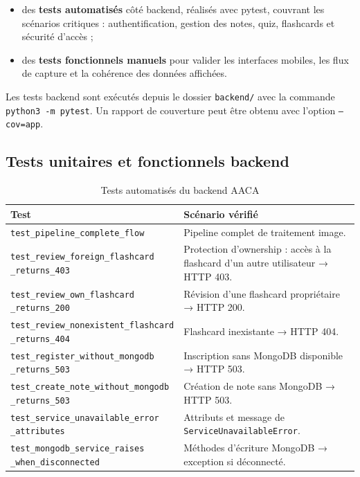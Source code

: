 \documentclass[12pt,a4paper]{report}
\begin{document}
\begin{itemize}[label=--]
    \item des \textbf{tests automatisés} côté backend, réalisés avec pytest, couvrant les scénarios critiques : authentification, gestion des notes, quiz, flashcards et sécurité d'accès ;
    \item des \textbf{tests fonctionnels manuels} pour valider les interfaces mobiles, les flux de capture et la cohérence des données affichées.
\end{itemize}

Les tests backend sont exécutés depuis le dossier \texttt{backend/} avec la commande \texttt{python3 -m pytest}. Un rapport de couverture peut être obtenu avec l'option \texttt{--cov=app}.

\subsection{Tests unitaires et fonctionnels backend}

\begin{table}[H]
\centering
\begin{tabularx}{\textwidth}{|p{6.5cm}|X|}
\hline
\textbf{Test} & \textbf{Scénario vérifié}\\
\hline
\texttt{test\_pipeline\_complete\_flow} & Pipeline complet de traitement image.\\
\hline
\texttt{test\_review\_foreign\_flashcard\\\_returns\_403} & Protection d'ownership : accès à la flashcard d'un autre utilisateur → HTTP 403.\\
\hline
\texttt{test\_review\_own\_flashcard\\\_returns\_200} & Révision d'une flashcard propriétaire → HTTP 200.\\
\hline
\texttt{test\_review\_nonexistent\_flashcard\\\_returns\_404} & Flashcard inexistante → HTTP 404.\\
\hline
\texttt{test\_register\_without\_mongodb\\\_returns\_503} & Inscription sans MongoDB disponible → HTTP 503.\\
\hline
\texttt{test\_create\_note\_without\_mongodb\\\_returns\_503} & Création de note sans MongoDB → HTTP 503.\\
\hline
\texttt{test\_service\_unavailable\_error\\\_attributes} & Attributs et message de \texttt{ServiceUnavailableError}.\\
\hline
\texttt{test\_mongodb\_service\_raises\\\_when\_disconnected} & Méthodes d'écriture MongoDB → exception si déconnecté.\\
\hline
\end{tabularx}
\caption{Tests automatisés du backend AACA}
\label{tab:tests}
\end{table}
\end{document}
